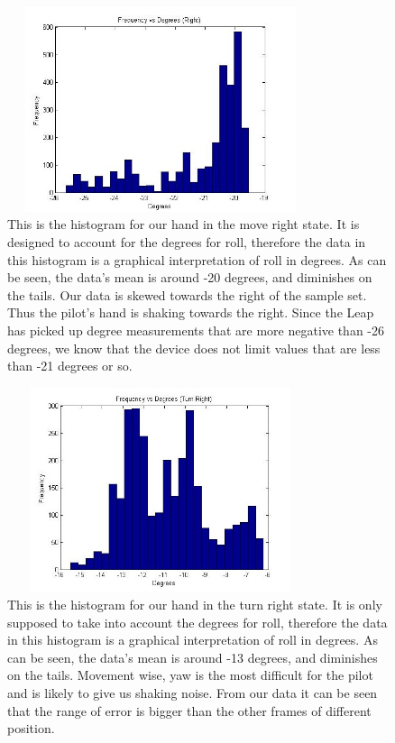 \documentclass[letterpaper,english, 12pt]{article}
\begin{document}
\begin{figure}[H]
	\centering
	\includegraphics[height=6cm,width=90mm]{pics/rightHistogram1.jpg}
	\caption{This is the histogram for our hand in the move right state. It is designed to account for the degrees for roll, therefore the data in this histogram is a graphical interpretation of roll in degrees.  As can be seen, the data's mean is around -20 degrees, and diminishes on the tails. 
Our data is skewed towards the right of the sample set. Thus the pilot's hand is shaking towards the right. Since the Leap has picked up degree measurements that are more negative than -26 degrees, we know that the device does not limit values that are less than -21 degrees or so.}

\end{figure}

\begin{figure}[H]
	\centering
	\includegraphics[height=6cm,width=90mm]{pics/turnRightHistogram1.jpg}
	\caption{This is the histogram for our hand in the turn right state. It is only supposed to take into account the degrees for roll, therefore the data in this histogram is a graphical interpretation of roll in degrees.  As can be seen, the data's mean is around -13 degrees, and diminishes on the tails. Movement wise, yaw is the most difficult for the pilot and is likely to give us shaking noise.  From our data it can be seen that the range of error is bigger than the other frames of different position.}
\end{figure}
\end{document}
